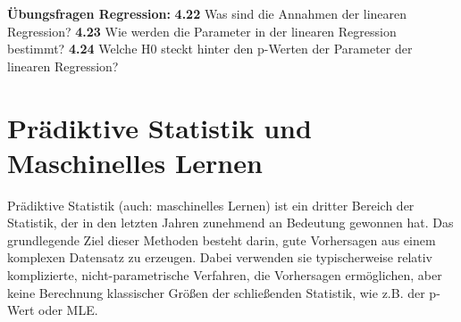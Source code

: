 \documentclass[a4paper,twoside]{tufte-book}\usepackage[]{graphicx}\usepackage[]{color}
\begin{document}

\vspace{1cm}
\begin{fullwidth}
\begin{mdframed}[backgroundcolor=black!10,rightline=false,leftline=false]
    
\textbf{Übungsfragen Regression:} 
\textbf{4.22} Was sind die Annahmen der linearen Regression?
\textbf{4.23} Wie werden die Parameter in der linearen Regression bestimmt?
\textbf{4.24} Welche H0 steckt hinter den p-Werten der Parameter der linearen Regression?

\end{mdframed}
\end{fullwidth}


\chapter{Prädiktive Statistik und Maschinelles Lernen}\label{ch: Prädiktive Statistik}

Prädiktive Statistik (auch: maschinelles Lernen) ist ein dritter Bereich der Statistik, der in den letzten Jahren zunehmend an Bedeutung gewonnen hat. Das grundlegende Ziel dieser Methoden besteht darin, gute Vorhersagen aus einem komplexen Datensatz zu erzeugen. Dabei verwenden sie typischerweise relativ komplizierte, nicht-parametrische Verfahren, die Vorhersagen ermöglichen, aber keine Berechnung klassischer Größen der schließenden Statistik, wie z.B. der p-Wert oder MLE. 
\end{document}
